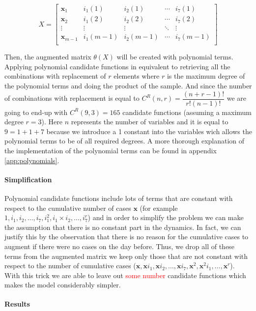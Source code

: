 \documentclass[12pt, letterpaper]{article}
\newcommand{\com}[1]{{\small {\fontfamily{ptm} \selectfont \textcolor{red}{#1}}}}
\begin{document}
$$X =
\begin{bmatrix}
\mathbf{x}_1 & i_1(1) & i_2(1) & \cdots & i_7(1) \\
\mathbf{x}_2 & i_1(2) & i_2(2) & \cdots & i_7(2) \\
\vdots & \vdots & \vdots & \ddots & \vdots \\
\mathbf{x}_{m-1} & i_1(m-1) & i_2(m-1) & \cdots & i_7(m-1) \\
\end{bmatrix}
$$

Then, the augmented matrix $\theta(X)$ will be created with polynomial terms.
Applying polynomial candidate functions in equivalent to retrieving all the combinations with replacement of $r$ elements where $r$ is the maximum degree of the polynomial terms and doing the product of the sample. 
And since the number of combinations with replacement is equal to $C^R(n,r) = \dfrac{(n + r - 1)!}{ r! (n - 1)! }$ we are going to end-up with $C^R(9, 3) = 165$ candidate functions (assuming a maximum degree $r=3$). 
Here $n$ represents the number of variables and it is equal to $9=1+1+7$ because we introduce a 1 constant into the variables wich allows the polynomial terms to be of all required degrees. 
A more thorough explanation of the implementation of the polynomial terms can be found in appendix \ref{app:polynomials}.

\paragraph{Simplification}
Polynomial candidate functions include lots of terms that are constant with respect to the cumulative number of cases $\mathbf{x}$ (for example $1, i_1, i_2, \dots, i_7, i_1^2, i_1 \times i_2, \dots, i_7^r$) and in order to simplify the problem we can make the assumption that there is no constant part in the dynamics. 
In fact, we can justify this by the observation that there is no reason for the cumulative cases to augment if there were no cases on the day before.
Thus, we drop all of these terms from the augmented matrix we keep only those that are not constant with respect to the number of cumulative cases ($\mathbf{x}, \mathbf{x} i_1, \mathbf{x} i_2, \dots, \mathbf{x} i_7, \mathbf{x}^2, \mathbf{x}^2 i_1, \dots, \mathbf{x}^r$).
With this trick we are able to leave out \com{some number} candidate functions which makes the model considerably simpler.

\paragraph{Results} 
\end{document}
